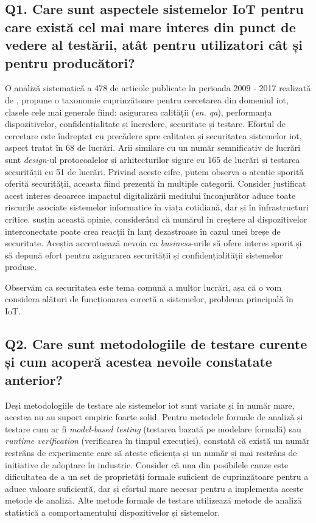 \subsection*{Q1. Care sunt aspectele sistemelor IoT pentru care există cel mai mare interes din punct de vedere al testării, atât pentru utilizatori cât și pentru producători?}

O analiză sistematică a 478 de articole publicate în perioada 2009 - 2017 realizată de \cite{Ahmed2019}, propune o taxonomie cuprinzătoare pentru cercetarea din domeniul \acrshort{iot}, clasele cele mai generale fiind: asigurarea calității (\textit{en. \acrlong{qa}}), performanța dispozitivelor, confidențialitate și încredere, securitate și testare. Efortul de cercetare este îndreptat cu precădere spre calitatea și securitatea sistemelor \acrshort{iot}, aspect tratat în 68 de lucrări. Arii similare cu un număr semnificativ de lucrări sunt \textit{design}-ul protocoalelor și arhitecturilor sigure cu 165 de lucrări și testarea securității cu 51 de lucrări. Privind aceste cifre, putem observa o atenție sporită oferită securității, aceasta fiind prezentă în multiple categorii. Consider justificat acest interes deoarece impactul digitalizării mediului înconjurător aduce toate riscurile asociate sistemelor informatice în viața cotidiană, dar și în infrastructuri critice. \cite{Lee2015} susțin această opinie, considerând că numărul în creștere al dispozitivelor interconectate poate crea reacții în lanț dezastroase în cazul unei breșe de securitate. Aceștia accentuează nevoia ca \textit{business}-urile să ofere interes sporit și să depună efort pentru asigurarea securității și confidențialității sistemelor produse.

Observăm ca securitatea este tema comună a multor lucrări, așa că o vom considera alături de funcționarea corectă a sistemelor, problema principală în IoT.


\subsection*{Q2. Care sunt metodologiile de testare curente și cum acoperă acestea nevoile constatate anterior?}

Deși metodologiile de testare ale sistemelor \acrshort{iot} sunt variate și în număr mare, acestea nu au suport empiric foarte solid. Pentru metodele formale de analiză și testare cum ar fi \textit{model-based testing} (testarea bazată pe modelare formală) sau \textit{runtime verification} (verificarea în timpul execuției), \cite{Ahmed2019} constată că există un număr restrâns de experimente care să ateste eficiența și un număr și mai restrâns de inițiative de adoptare în industrie. Consider că una din posibilele cauze este dificultatea de a un set de proprietăți formale suficient de cuprinzătoare pentru a aduce valoare suficientă, dar și efortul mare necesar pentru a implementa aceste metode de analiză. Alte metode formale de testare utilizează metode de analiză statistică a comportamentului dispozitivelor și sistemelor. 

